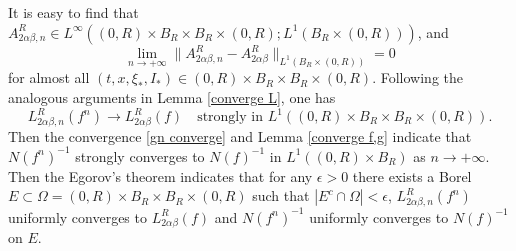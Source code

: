 \documentclass[reqno,11pt]{amsart}
\numberwithin{equation}{section}
\begin{document}
It is easy to find that $A^R_{2\alpha \beta, n } \in L^\infty ((0,R)\times B_R \times B_R \times (0,R);L^1(B_R \times (0,R)))$, and 
$$\lim_{n \to + \infty} \| A^R_{2\alpha \beta, n } - A^R_{2\alpha \beta} \|_{L^1 (B_R \times (0, R))} = 0$$ 
for almost all $(t, x, \xi_*, I_*) \in (0, R) \times B_R \times B_R \times (0, R)$. Following the analogous arguments in Lemma \ref{converge L}, one has
\begin{equation*}
L^R_{2\alpha \beta, n }(f^n) \rightarrow L^R_{2\alpha \beta}(f) \quad \text{strongly in } L^1((0,R)\times B_R \times B_R \times (0,R)).
\end{equation*}
Then the convergence \eqref{gn converge} and Lemma \ref{converge f,g} indicate that $N (f^n)^{-1}$ strongly converges to $N (f)^{-1}$ in $L^1 ( (0, R) \times B_R )$ as $n \to + \infty$. Then the Egorov's theorem indicates that for any $\epsilon>0$ there exists a Borel $E\subset \Omega = (0,R)\times B_R \times B_R\times (0,R)$ such that $|E^c \cap \Omega|<\epsilon$, $ L^R_{2\alpha \beta, n }(f^n) $ uniformly converges to $ L^R_{2\alpha \beta}(f) $ and $ N (f^n)^{-1} $ uniformly converges to $ N (f)^{-1} $ on $E$. 
\end{document}
